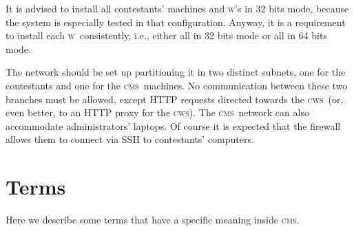 \documentclass[a4paper,8pt]{amsart}
\newcommand{\CMS}{\textsc{cms}}
\newcommand{\WS}{\textsc{w}}
\newcommand{\CWS}{\textsc{cws}}
\begin{document}
\begin{multicols}{2}
  It is advised to install all contestants' machines and \WS's in 32
  bits mode, because the system is especially tested in that
  configuration. Anyway, it is a requirement to install each
  \WS\ consistently, i.e., either all in 32 bits mode or all in 64
  bits mode.

  The network should be set up partitioning it in two distinct
  subnets, one for the contestants and one for the \CMS\ machines. No
  communication between these two branches must be allowed, except
  HTTP requests directed towards the \CWS\ (or, even better, to an
  HTTP proxy for the \CWS). The \CMS\ network can also accommodate
  administrators' laptops. Of course it is expected that the firewall
  allows them to connect via SSH to contestants' computers.


  \section{Terms}

  Here we describe some terms that have a specific meaning inside
  \CMS{}.


\end{multicols}
\end{document}
